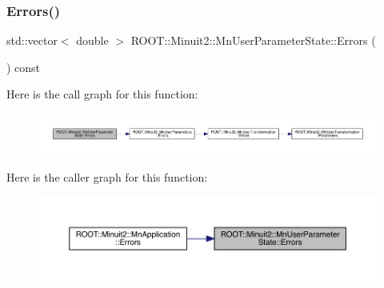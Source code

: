 \mbox{\label{classROOT_1_1Minuit2_1_1MnUserParameterState_ae054d826075fa4fb7dac12a60afdef63}} 
\subsubsection{\texorpdfstring{Errors()}{Errors()}\hspace{0.1cm}{\footnotesize\ttfamily [2/2]}}
{\footnotesize\ttfamily std\+::vector$<$ double $>$ R\+O\+O\+T\+::\+Minuit2\+::\+Mn\+User\+Parameter\+State\+::\+Errors (\begin{DoxyParamCaption}{ }\end{DoxyParamCaption}) const}

Here is the call graph for this function\+:\nopagebreak
\begin{figure}[H]
\begin{center}
\leavevmode
\includegraphics[width=350pt]{d3/de0/classROOT_1_1Minuit2_1_1MnUserParameterState_ae054d826075fa4fb7dac12a60afdef63_cgraph}
\end{center}
\end{figure}
Here is the caller graph for this function\+:\nopagebreak
\begin{figure}[H]
\begin{center}
\leavevmode
\includegraphics[width=350pt]{d3/de0/classROOT_1_1Minuit2_1_1MnUserParameterState_ae054d826075fa4fb7dac12a60afdef63_icgraph}
\end{center}
\end{figure}
\mbox{\label{classROOT_1_1Minuit2_1_1MnUserParameterState_a8e0b79e3a150b2ccd15678755b1adb4a}} 
